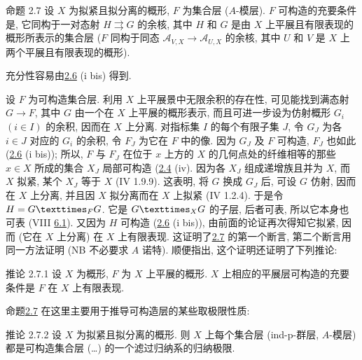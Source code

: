 \begin{enonce*}{命题 2.7}
设 $X$ 为拟紧且拟分离的概形, $F$ 为集合层 (\resp $A$-模层).
$F$ 可构造的充要条件是,
它同构于一对态射 $H\rightrightarrows G$ 的余核,
其中 $H$ 和 $G$ 是由 $X$ 上平展且有限表现的概形所表示的集合层
(\resp $F$ 同构于同态 $𝒜_{V,X}\rightarrow 𝒜_{U,X}$ 的余核,
其中 $U$ 和 $V$ 是 $X$ 上两个平展且有限表现的概形).
\end{enonce*}


充分性容易由\hyperref[IX.prop2.6]{2.6} (i bis) 得到.

设 $F$ 为可构造集合层.
利用 $X$ 上平展景中无限余积的存在性, 可见能找到满态射 $G\rightarrow F$,
其中 $G$ 由一个在 $X$ 上平展的概形表示,
而且可进一步设为仿射概形 $G_i$ $(i\in I)$ 的余积,
因而在 $X$ 上分离.
对指标集 $I$ 的每个有限子集 $J$, 令 $G_J$ 为各 $i\in J$ 对应的 $G_i$ 的余积,
令 $F_J$ 为它在 $F$ 中的像.
因为 $G_J$ 及 $F$ 可构造, $F_J$ 也如此 (\hyperref[IX.prop2.6]{2.6} (i bis));
所以, $F$ 与 $F_J$ 在位于 $x$ 上方的 $X$ 的几何点处的纤维相等的那些 $x\in X$
所成的集合 $X_J$ 局部可构造 (\hyperref[IX.prop2.4]{2.4} (iv).
因为各 $X_J$ 组成递增族且并为 $X$, 而 $X$ 拟紧,
某个 $X_J$ 等于 $X$ (\EGA IV 1.9.9).
这表明, 将 $G$ 换成 $G_J$ 后, 可设 $G$ 仿射,
因而在 $X$ 上分离, 并且因 $X$ 拟分离而在 $X$ 上拟紧 (\EGA IV 1.2.4).
于是令 $H=\fprod{G}{G}{F}$.
它是 $\fprod{G}{G}{X}$ 的子层, 后者可表,
所以它本身也可表 (VIII \hyperref[VIII.prop6.1]{6.1}).
又因为 $H$ 可构造 (\hyperref[IX.prop2.6]{2.6} (i bis)),\pageoriginale
由前面的论证再次得知它拟紧, 因而 (它在 $X$ 上分离) 在 $X$ 上有限表现.
这证明了\hyperref[IX.prop2.7]{2.7} 的第一个断言,
第二个断言用同一方法证明 (NB 不必要求 $A$ 诺特).
顺便指出, 这个证明还证明了下列推论:

\begin{enonce*}{推论 2.7.1}
设 $X$ 为概形, $F$ 为 $X$ 上平展的概形.
$X$ 上相应的平展层可构造的充要条件是 $F$ 在 $X$ 上有限表现.
\end{enonce*}

命题\hyperref[IX.prop2.7]{2.7} 在这里主要用于推导可构造层的某些取极限性质:

\begin{enonce*}{推论 2.7.2}
设 $X$ 为拟紧且拟分离的概形.
则 $X$ 上每个集合层 (\resp ind-p-群层, \resp $A$-模层)
都是可构造集合层 (\resp\ldots) 的一个滤过归纳系的归纳极限.
\end{enonce*}

